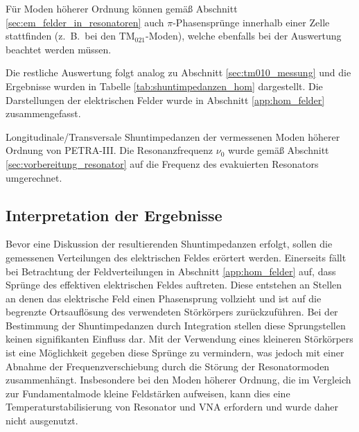 Für Moden höherer Ordnung können gemäß Abschnitt \ref{sec:em_felder_in_resonatoren} auch $\pi$-Phasensprünge innerhalb einer Zelle stattfinden (z.\ B.\ bei den $\mathrm{TM}_{021}$-Moden), welche ebenfalls bei der Auswertung beachtet werden müssen.

Die restliche Auswertung folgt analog zu Abschnitt \ref{sec:tm010_messung} und die Ergebnisse wurden in Tabelle \ref{tab:shuntimpedanzen_hom} dargestellt.
Die Darstellungen der elektrischen Felder wurde in Abschnitt \ref{app:hom_felder} zusammengefasst.
\begin{table}[htb]
	\centering
	
	\caption{Longitudinale/Transversale Shuntimpedanzen der vermessenen Moden höherer Ordnung von PETRA-III. Die Resonanzfrequenz $\nu_0$ wurde gemäß Abschnitt \ref{sec:vorbereitung_resonator} auf die Frequenz des evakuierten Resonators umgerechnet.}
	\label{tab:shuntimpedanzen_hom}
\end{table}


\subsection{Interpretation der Ergebnisse}
Bevor eine Diskussion der resultierenden Shuntimpedanzen erfolgt, sollen die gemessenen Verteilungen des elektrischen Feldes erörtert werden.
Einerseits fällt bei Betrachtung der Feldverteilungen in Abschnitt \ref{app:hom_felder} auf, dass Sprünge des effektiven elektrischen Feldes auftreten.
Diese entstehen an Stellen an denen das elektrische Feld einen Phasensprung vollzieht und ist auf die begrenzte Ortsauflösung des verwendeten Störkörpers zurückzuführen.
Bei der Bestimmung der Shuntimpedanzen durch Integration stellen diese Sprungstellen keinen signifikanten Einfluss dar.
Mit der Verwendung eines kleineren Störkörpers ist eine Möglichkeit gegeben diese Sprünge zu vermindern, was jedoch mit einer Abnahme der Frequenzverschiebung durch die Störung der Resonatormoden zusammenhängt.
Insbesondere bei den Moden höherer Ordnung, die im Vergleich zur Fundamentalmode kleine Feldstärken aufweisen, kann dies eine Temperaturstabilisierung von Resonator und VNA erfordern und wurde daher nicht ausgenutzt.

